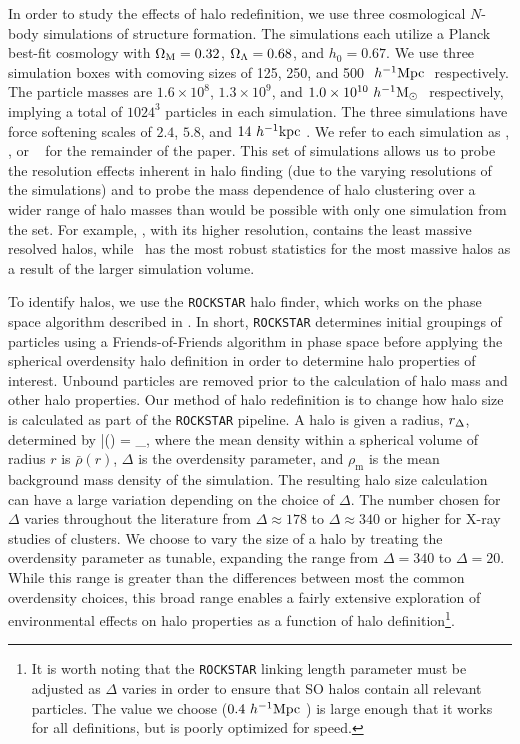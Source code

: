 \documentclass[usenatbib,fleqn]{mnras}
\begin{document}
In order to study the effects of halo redefinition, we use three cosmological $N$-body simulations of structure
formation. The \citet{diemer_kravtsov15} simulations each utilize a Planck best-fit cosmology with $\Omega_{\mathrm{M}} = 0.32$, $\Omega_{\Lambda} =
0.68$, and $h_0 = 0.67$. We use three simulation boxes with comoving sizes of 125, 250, and 500
$\ h^{-1}\mathrm{Mpc}~$ respectively. The particle masses are $1.6 \times 10^8$, $1.3 \times 10^9$, and $1.0 \times 10^{10}
\ h^{-1}\mathrm{M}_{\odot}~$ respectively, implying a total of $1024^3$ particles in each simulation. The three
simulations have force softening scales of $2.4$, $5.8$, and $14 \ h^{-1}\mathrm{kpc}~$. We refer to each simulation as
\simA, \simB, or \simC~  for the remainder of the paper. This set of simulations allows us to probe the
resolution effects inherent in halo finding (due to the varying resolutions of the simulations) and to probe the
mass dependence of halo clustering over a wider range of halo masses than would be possible with only one
simulation from the set. For example, \simA, with its higher resolution, contains the least massive resolved
halos, while \simC~has the most robust statistics for the most massive halos as a result of the larger simulation
volume.


To identify halos, we use the {\tt ROCKSTAR} halo finder, which works on the phase space algorithm described in
\citet*{behroozi_etal13a}. In short, {\tt ROCKSTAR} determines initial groupings of particles using a Friends-of-Friends algorithm 
in phase space before applying the spherical overdensity halo definition in order to determine halo properties of
interest. Unbound particles are removed prior to the calculation of halo mass and other halo properties. Our
method of halo redefinition is to change how halo size is calculated as part of the {\tt ROCKSTAR} pipeline. 
A halo is given a radius, $r_{\Delta}$, determined by
\beq
	\bar{\rho}(\Rdel) = \Delta \rho_{}, 
\eeq
where the mean density within a spherical volume of radius $r$ is $\bar{\rho}(r)$, $\Delta$ is the overdensity
parameter, and $\rho_{\mathrm{m}}$ is the mean background mass density of the simulation. The resulting
halo size calculation can have a large variation depending on the choice of $\Delta$. The number chosen for
$\Delta$ varies throughout the literature from $\Delta \approx 178$ to $\Delta \approx 340$ or higher for X-ray studies of 
clusters. We choose to vary the size of a halo by treating the overdensity parameter as tunable, expanding the range from 
$\Delta = 340$ to $\Delta = 20$. While this range is greater than the differences between most 
the common overdensity choices, this broad range enables a fairly extensive exploration of 
environmental effects on halo properties as a function of halo definition\footnote{It is worth noting that the 
{\tt ROCKSTAR} linking length parameter must be adjusted as $\Delta$ varies in order to ensure 
that SO halos contain all relevant particles. The value we choose ($0.4 \ h^{-1}\mathrm{Mpc}~$) is large enough that it works for all definitions, but is poorly optimized for speed.}.
\end{document}
